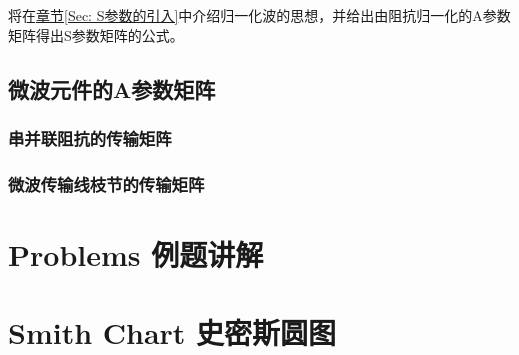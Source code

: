     将在\hyperref[Sec: S参数的引入]{章节\ref*{Sec: S参数的引入}}中介绍归一化波的思想，并给出由阻抗归一化的A参数矩阵得出S参数矩阵的公式。
\subsection{微波元件的A参数矩阵}
    \subsubsection{串并联阻抗的传输矩阵}
    \subsubsection{微波传输线枝节的传输矩阵}
\section{Problems 例题讲解}
\section{Smith Chart 史密斯圆图}
